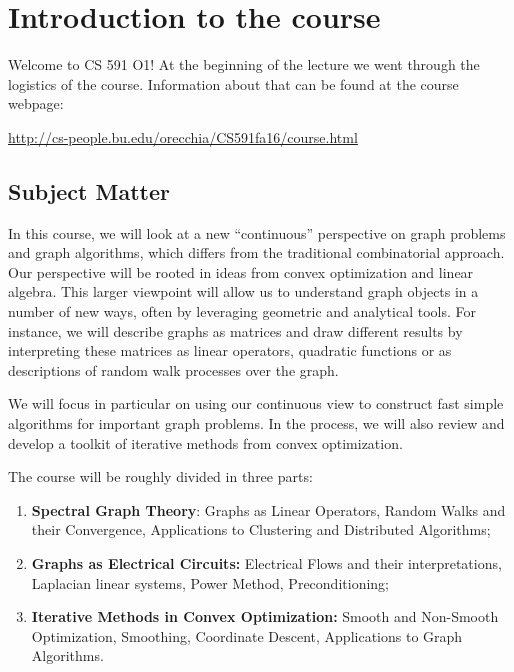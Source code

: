  \section{Introduction to the course}

Welcome to CS 591 O1! At the beginning of the lecture we went through the logistics of the course. Information about that can be found at the course webpage:
\begin{center}
\url{http://cs-people.bu.edu/orecchia/CS591fa16/course.html}
\end{center}

\subsection{Subject Matter}

In this course, we will look at a new ``continuous'' perspective on graph problems and graph algorithms, which differs from the traditional combinatorial approach. Our perspective will be rooted in ideas from convex optimization and linear algebra. This larger viewpoint will allow us to understand graph objects in a number of new ways, often by leveraging geometric and analytical tools. For instance, we will describe graphs as matrices and draw different results by interpreting these matrices as linear operators, quadratic functions or as descriptions of random walk processes over the graph. 

We will focus in particular on using our continuous view to construct fast simple algorithms for important graph problems. In the process, we will also review and develop a toolkit of iterative methods from convex optimization.

The course will be roughly divided in three parts:
\begin{enumerate}
\item {\bf Spectral Graph Theory}: Graphs as Linear Operators, Random Walks and their Convergence, Applications to Clustering and Distributed Algorithms;
\item {\bf Graphs as Electrical Circuits:}  Electrical Flows and their interpretations, Laplacian linear systems, Power Method, Preconditioning;
\item {\bf Iterative Methods in Convex Optimization:} Smooth and Non-Smooth Optimization, Smoothing, Coordinate Descent, Applications to Graph Algorithms.
\end{enumerate}
